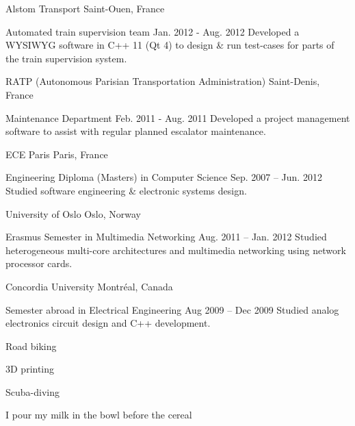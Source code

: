 \documentclass[10pt, a4paper]{awesome-cv}
\begin{document}


\begin{cventries}

	\cventrytitle
	{Alstom Transport}
	{Saint-Ouen, France}

	\cventry
	{Automated train supervision team}
	{Jan. 2012 - Aug. 2012}
	{Developed a WYSIWYG software in C++ 11 (Qt 4) to design \& run test-cases for parts of the train supervision system.}

	\cventrytitle
	{RATP (Autonomous Parisian Transportation Administration)}
	{Saint-Denis, France}

	\cventry
	{Maintenance Department}
	{Feb. 2011 - Aug. 2011}
	{Developed a project management software to assist with regular planned escalator maintenance.}

\end{cventries}


\begin{cventries}
	\cventrytitle
	{ECE Paris}
	{Paris, France}

	\cventry
	{Engineering Diploma (Masters) in Computer Science}
	{Sep. 2007 – Jun. 2012}
	{Studied software engineering \& electronic systems design.}

	\cventrytitle
	{University of Oslo}
	{Oslo, Norway}

	\cventry
	{Erasmus Semester in Multimedia Networking}
	{Aug. 2011 – Jan. 2012}
	{Studied heterogeneous multi-core architectures and multimedia networking using network processor cards.}

	\cventrytitle
	{Concordia University}
	{Montréal, Canada}

	\cventry
	{Semester abroad in Electrical Engineering}
	{Aug 2009 – Dec 2009}
	{Studied analog electronics circuit design and C++ development.}

\end{cventries}


\begin{cventries}
	\begin{cvitems}
		\item {Road biking}
		\item {3D printing}
		\item {Scuba-diving}
		\item {I pour my milk in the bowl before the cereal}
	\end{cvitems}
\end{cventries}
\end{document}
